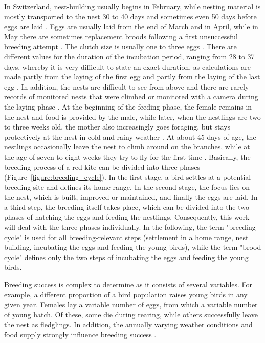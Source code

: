In Switzerland, nest-building usually begins in February, while nesting material is mostly transported to the nest 30 to 40 days and sometimes even 50 days before eggs are laid \parencite{scherler2023brutbiologie}. Eggs are usually laid from the end of March and in April, while in May there are sometimes replacement broods following a first unsuccessful breeding attempt \parencite{aebischer2021rotmilan}. The clutch size is usually one to three eggs \parencite{mougeot2011breeding}. There are different values for the duration of the incubation period, ranging from 28 to 37 days, whereby it is very difficult to state an exact duration, as calculations are made partly from the laying of the first egg and partly from the laying of the last egg \parencite{aebischer2021rotmilan}. In addition, the nests are difficult to see from above and there are rarely records of monitored nests that were climbed or monitored with a camera during the laying phase \parencite{aebischer2021rotmilan}. At the beginning of the feeding phase, the female remains in the nest and food is provided by the male, while later, when the nestlings are two to three weeks old, the mother also increasingly goes foraging, but stays protectively at the nest in cold and rainy weather \parencite{aebischer2021rotmilan, spatz2021zwischen}. At about 45 days of age, the nestlings occasionally leave the nest to climb around on the branches, while at the age of seven to eight weeks they try to fly for the first time \parencite{aebischer2021rotmilan}. Basically, the breeding process of a red kite can be divided into three phases (Figure~\ref{figure:breeding_cycle}). In the first stage, a bird settles at a potential breeding site and defines its home range. In the second stage, the focus lies on the nest, which is built, improved or maintained, and finally the eggs are laid. In a third step, the breeding itself takes place, which can be divided into the two phases of hatching the eggs and feeding the nestlings. Consequently, this work will deal with the three phases individually. In the following, the term "breeding cycle" is used for all breeding-relevant steps (settlement in a home range, nest building, incubating the eggs and feeding the young birds), while the term "brood cycle" defines only the two steps of incubating the eggs and feeding the young birds.

Breeding success is complex to determine as it consists of several variables. For example, a different proportion of a bird population raises young birds in any given year. Females lay a variable number of eggs, from which a variable number of young hatch. Of these, some die during rearing, while others successfully leave the nest as fledglings. In addition, the annually varying weather conditions and food supply strongly influence breeding success \parencite{naegeli2021weather}.

